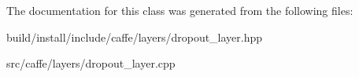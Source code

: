 The documentation for this class was generated from the following files\+:\begin{DoxyCompactItemize}
\item 
build/install/include/caffe/layers/dropout\+\_\+layer.\+hpp\item 
src/caffe/layers/dropout\+\_\+layer.\+cpp\end{DoxyCompactItemize}
